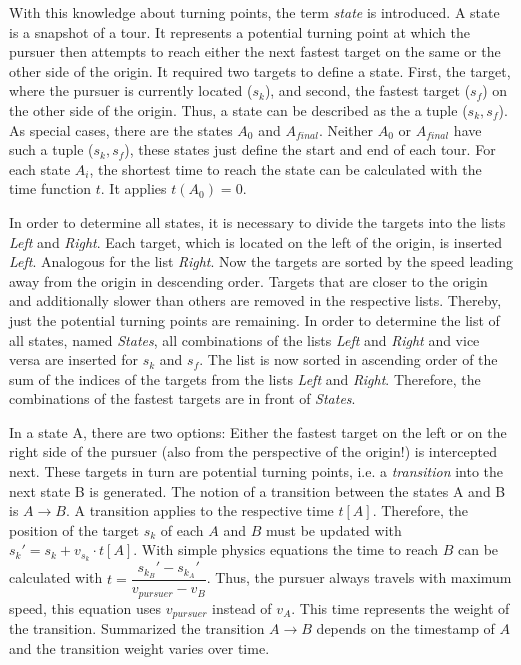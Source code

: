 \documentclass[english,version-2019-07]{uzl-thesis}
\begin{document}
With this knowledge about turning points, the term \emph{state} is introduced. A state is a snapshot of a tour. It represents a potential turning point at which the pursuer then attempts to reach either the next fastest target on the same or the other side of the origin. It required two targets to define a state. First, the target, where the pursuer is currently located ($s_k$), and second, the fastest target ($s_f$) on the other side of the origin. Thus, a state can be described as the a tuple ($s_k, s_f$). As special cases, there are the states $A_0$ and $A_{final}$. Neither $A_0$ or $A_{final}$ have such a tuple ($s_k, s_f$), these states just define the start and end of each tour. For each state $A_i$, the shortest time to reach the state can be calculated with the time function $t$. It applies $t(A_0) = 0$.

In order to determine all states, it is necessary to divide the targets into the lists \emph{Left} and \emph{Right}. Each target, which is located on the left of the origin, is inserted \emph{Left}. Analogous for the list \emph{Right}. Now the targets are sorted by the speed leading away from the origin in descending order. Targets that are closer to the origin and additionally slower than others are removed in the respective lists. Thereby, just the potential turning points are remaining. In order to determine the list of all states, named \emph{States}, all combinations of the lists \emph{Left} and \emph{Right} and vice versa are inserted for $s_k$ and $s_f$. The list is now sorted in ascending order of the sum of the indices of the targets from the lists \emph{Left} and \emph{Right}. Therefore, the combinations of the fastest targets are in front of \emph{States}. 

In a state A, there are two options: Either the fastest target on the left or on the right side of the pursuer (also from the perspective of the origin!) is intercepted next. These targets in turn are potential turning points, i.e. a \emph{transition} into the next state B is generated. The notion of a transition between the states A and B is $A\rightarrow B$. A transition applies to the respective time $t[A]$. Therefore, the position of the target $s_k$ of each $A$ and $B$ must be updated with $s_k'= s_k + v_{s_k} \cdot t[A]$. With simple physics equations the time to reach $B$ can be calculated with $t = \dfrac{s_{k_{B}}' - s_{k_{A}}'}{v_{pursuer} - v_{B}}$. Thus, the pursuer always travels with maximum speed, this equation uses $v_{pursuer}$ instead of $v_{A}$. This time represents the weight of the transition. Summarized the transition $A\rightarrow B$ depends on the timestamp of $A$ and the transition weight varies over time. 
\end{document}
